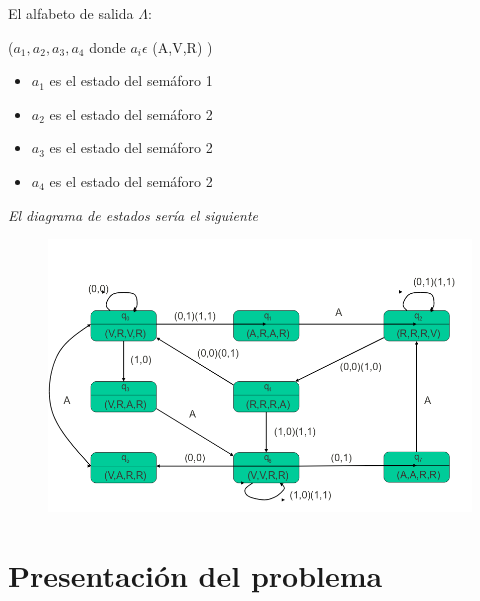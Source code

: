 \documentclass[12pt,a4paper]{article}
\begin{document}
El alfabeto de salida $\Lambda$: { ($a_{1},a_{2},a_{3},a_{4}$ donde $a_{i}\epsilon$ (A,V,R) )
	\begin{itemize}
		\item $a_{1}$ es el estado del semáforo 1
		\item $a_{2}$ es el estado del semáforo 2
		\item $a_{3}$ es el estado del semáforo 2
		\item $a_{4}$ es el estado del semáforo 2
	\end{itemize}

	\begin{center}
		\textit{El diagrama de estados sería el siguiente}
	\end{center}

	\begin{figure}[h]
		\centering
		\includegraphics[width=0.7
		\linewidth]{img/3}
		\caption{}
		\label{fig:3}
	\end{figure}

	\newpage
	\section{Presentación del problema}
}
\end{document}
